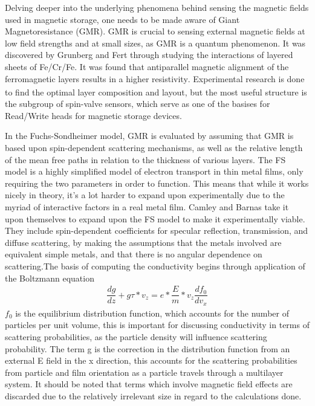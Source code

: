\documentclass[11pt]{article}
\begin{document}
\begin{multicols}{2}
Delving deeper into the underlying phenomena behind sensing the magnetic fields used in magnetic storage, one needs to be made aware of Giant Magnetoresistance (GMR). GMR is crucial to sensing external magnetic fields at low field strengths and at small sizes, as GMR is a quantum phenomenon. It was discovered by Grunberg and Fert through studying the interactions of layered sheets of Fe/Cr/Fe. It was found that antiparallel magnetic alignment of the ferromagnetic layers results in a higher resistivity\textsubscript{\cite{label5}}. Experimental research is done to find the optimal layer composition and layout, but the most useful structure is the subgroup of spin-valve sensors, which serve as one of the basises for Read/Write heads for magnetic storage devices.

In the Fuchs-Sondheimer model, GMR is evaluated by assuming that GMR is based upon spin-dependent scattering mechanisms, as well as the relative length of the mean free paths in relation to the thickness of various layers. The FS model is a highly simplified model of electron transport in thin metal films, only requiring the two parameters in order to function. This means that while it works nicely in theory, it’s a lot harder to expand upon experimentally due to the myriad of interactive factors in a real metal film. Camley and Barnas take it upon themselves to expand upon the FS model to make it experimentally viable. They include spin-dependent coefficients for specular reflection, transmission, and diffuse scattering, by making the assumptions that the metals involved are equivalent simple metals, and that there is no angular dependence on scattering.The basis of computing the conductivity begins through application of the Boltzmann equation
\begin{align*}
\dfrac{dg}{dz}+ g τ*v_z = e*\dfrac{E}{m}*v_z \dfrac{df_0}{dv_x}
\end{align*}
$f_0$ is the equilibrium distribution function, which accounts for the number of particles per unit volume, this is important for discussing conductivity in terms of scattering probabilities, as the particle density will influence scattering probability. The term g is the correction in the distribution function from an external E field in the x direction, this accounts for the scattering probabilities from particle and film orientation as a particle travels through a multilayer system. It should be noted that terms which involve magnetic field effects are discarded due to the relatively irrelevant size in regard to the calculations done\textsubscript{\cite{label2}}. 


\end{multicols}
\end{document}
